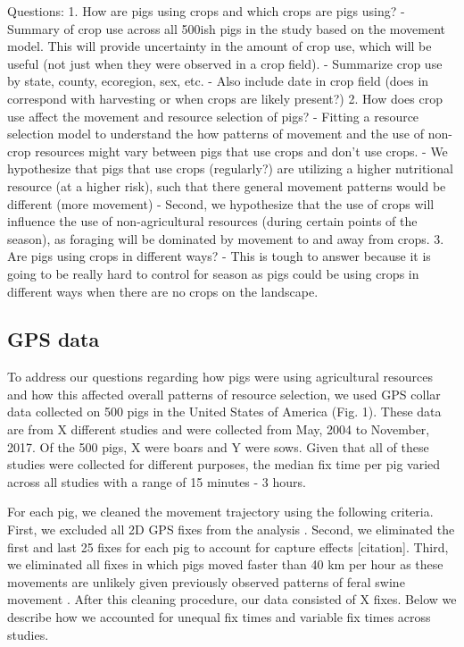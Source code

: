 \documentclass[a4paper]{article}
\begin{document}
Questions: 
1. How are pigs using crops and which crops are pigs using? 
	- Summary of crop use across all 500ish pigs in the study based on the movement model.  This will provide uncertainty in the amount of crop use, which will be useful (not just when they were observed in a crop field).  
	- Summarize crop use by state, county, ecoregion, sex, etc. 
	- Also include date in crop field (does in correspond with harvesting or when crops are likely present?)
2. How does crop use affect the movement and resource selection of pigs?
	- Fitting a resource selection model to understand the how patterns of movement and the use of non-crop resources might vary between pigs that use crops and don't use crops.
	- We hypothesize that pigs that use crops (regularly?) are utilizing a higher nutritional resource (at a higher risk), such that there general movement patterns would be different (more movement)
	- Second, we hypothesize that the use of crops will influence the use of non-agricultural resources (during certain points of the season), as foraging will be dominated by movement to and away from crops. 
3. Are pigs using crops in different ways?
	- This is tough to answer because it is going to be really hard to control for season as pigs could be using crops in different ways when there are no crops on the landscape.

\subsection*{GPS data}

To address our questions regarding how pigs were using agricultural resources and how this affected overall patterns of resource selection, we used GPS collar data collected on 500 pigs in the United States of America (Fig. 1). These data are from X different studies and were collected from May, 2004 to November, 2017.  Of the 500 pigs, X were boars and Y were sows.  Given that all of these studies were collected for different purposes, the median fix time per pig varied across all studies with a range of 15 minutes - 3 hours. 

For each pig, we cleaned the movement trajectory using the following criteria. First, we excluded all 2D GPS fixes from the analysis \citep{Bjorneraas2010}.  Second, we eliminated the first and last 25 fixes for each pig to account for capture effects [citation]. Third, we eliminated all fixes in which pigs moved faster than 40 km per hour as these movements are unlikely given previously observed patterns of feral swine movement \citep{Mayer2009}. After this cleaning procedure, our data consisted of X fixes.  Below we describe how we accounted for unequal fix times and variable fix times across studies.
\end{document}
